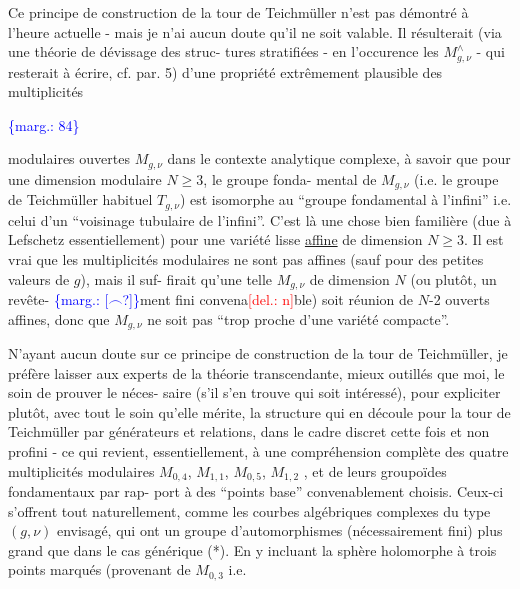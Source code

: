 \documentclass[11pt]{article}
\newcommand{\scanpage}[1]{\par\bigskip\noindent{\small\sffamily[scan #1]}\par}
\newcommand{\mspage}[1]{{\small\sffamily[p.\,#1]}}
\newcommand{\margin}[1]{\textcolor{blue}{\{\textsf{marg.:} #1\}}}
\newcommand{\deleted}[1]{\textcolor{red}{[\textsf{del.:} #1]}}
\newcommand{\uline}[1]{\underline{#1}}
\newcommand{\unsure}[1]{[#1?]}
\begin{document}
Ce principe de construction de la tour de Teichmüller n'est
pas démontré à l'heure actuelle - mais je n'ai aucun doute qu'il ne
soit valable. Il résulterait (via une théorie de dévissage des struc-%
tures stratifiées - en l'occurence les $M^{\wedge}_{g,\nu}$ - qui resterait à écrire,
cf. par. 5) d'une propriété extrêmement plausible des multiplicités

\margin{84}

\clearpage
\scanpage{119/85}
\mspage{7}

modulaires ouvertes $M_{g,\nu}$ dans le contexte analytique complexe,
à savoir que pour une dimension modulaire $N \geq 3$, le groupe fonda-%
mental de $M_{g,\nu}$ (i.e. le groupe de Teichmüller habituel $T_{g,\nu}$)
est isomorphe au ``groupe fondamental à l'infini'' i.e. celui d'un
``voisinage tubulaire de l'infini''. C'est là une chose bien familière
(due à Lefschetz essentiellement) pour une variété lisse \uline{affine} de
dimension $N \geq 3$. Il est vrai que les multiplicités modulaires ne
sont pas affines (sauf pour des petites valeurs de $g$), mais il suf-%
firait qu'une telle $M_{g,\nu}$ de dimension $N$ (ou plutôt, un revête-%
\margin{\unsure{$\frown$}}ment fini convena\deleted{n}ble) soit réunion de $N$-2 ouverts affines, donc
que $M_{g,\nu}$ ne soit pas ``trop proche d'une variété compacte''.

N'ayant aucun doute sur ce principe de construction de la
tour de Teichmüller, je préfère laisser aux experts de la théorie
transcendante, mieux outillés que moi, le soin de prouver le néces-%
saire (s'il s'en trouve qui soit intéressé), pour expliciter plutôt,
avec tout le soin qu'elle mérite, la structure qui en découle pour
la tour de Teichmüller par générateurs et relations, dans le cadre
discret cette fois et non profini - ce qui revient, essentiellement,
à une compréhension complète des quatre multiplicités modulaires
$M_{0,4}$, $M_{1,1}$, $M_{0,5}$, $M_{1,2}$ , et de leurs groupoïdes fondamentaux par rap-%
port à des ``points base'' convenablement choisis. Ceux-ci s'offrent
tout naturellement, comme les courbes algébriques complexes du type
$(g,\nu)$ envisagé, qui ont un groupe d'automorphismes (nécessairement
fini) plus grand que dans le cas générique (*). En y incluant la
sphère holomorphe à trois points marqués (provenant de $M_{0,3}$ i.e.
\end{document}
